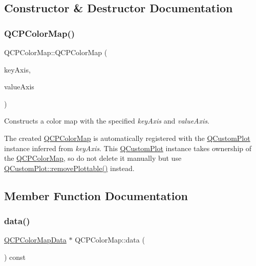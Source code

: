 \subsection{Constructor \& Destructor Documentation}
\mbox{\label{class_q_c_p_color_map_aa37e976d2ee1e2be6c4cd88a64b36215}} 
\subsubsection{\texorpdfstring{Q\+C\+P\+Color\+Map()}{QCPColorMap()}}
{\footnotesize\ttfamily Q\+C\+P\+Color\+Map\+::\+Q\+C\+P\+Color\+Map (\begin{DoxyParamCaption}\item[{\hyperlink{class_q_c_p_axis}{Q\+C\+P\+Axis} $\ast$}]{key\+Axis,  }\item[{\hyperlink{class_q_c_p_axis}{Q\+C\+P\+Axis} $\ast$}]{value\+Axis }\end{DoxyParamCaption})\hspace{0.3cm}{\ttfamily [explicit]}}

Constructs a color map with the specified {\itshape key\+Axis} and {\itshape value\+Axis}.

The created \hyperlink{class_q_c_p_color_map}{Q\+C\+P\+Color\+Map} is automatically registered with the \hyperlink{class_q_custom_plot}{Q\+Custom\+Plot} instance inferred from {\itshape key\+Axis}. This \hyperlink{class_q_custom_plot}{Q\+Custom\+Plot} instance takes ownership of the \hyperlink{class_q_c_p_color_map}{Q\+C\+P\+Color\+Map}, so do not delete it manually but use \hyperlink{class_q_custom_plot_af3dafd56884208474f311d6226513ab2}{Q\+Custom\+Plot\+::remove\+Plottable()} instead. 

\subsection{Member Function Documentation}
\mbox{\label{class_q_c_p_color_map_a047d7eb3ae657f93f2f39b5e68b79451}} 
\subsubsection{\texorpdfstring{data()}{data()}}
{\footnotesize\ttfamily \hyperlink{class_q_c_p_color_map_data}{Q\+C\+P\+Color\+Map\+Data} $\ast$ Q\+C\+P\+Color\+Map\+::data (\begin{DoxyParamCaption}{ }\end{DoxyParamCaption}) const\hspace{0.3cm}{\ttfamily [inline]}}

